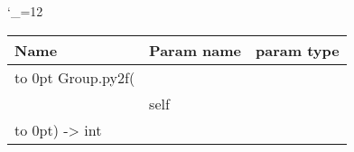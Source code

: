 \begingroup \catcode`\_=12 \tt
\begin{tabular}{lll}
\toprule
\textrm{Name}&\textrm{Param name}&\textrm{param type}\\
\midrule
\hbox to 0pt {Group.py2f(\hss}\\
& self\\
\hbox to 0pt{) -> int\hss}\\
\bottomrule
\end{tabular}
\endgroup
